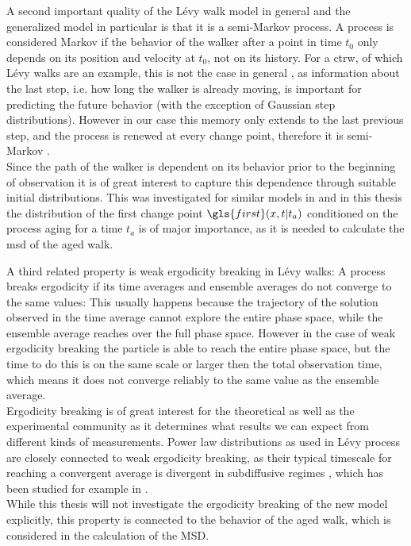 A second important quality of the L\'evy walk model in general and the generalized model in particular is that it is a semi-Markov process. A process is considered Markov if the behavior of the walker after a point in time $t_0$ only depends on its position and velocity at $t_0$, not on its history. For a \gls{ctrw}, of which L\'evy walks are an example, this is not the case in general 
\cite{firstSteps}, 
as information about the last step, i.e. how long the walker is already moving, is important for predicting the future behavior (with the exception of Gaussian step distributions). However in our case this memory only extends to the last previous step, and the process is renewed at every change point, therefore it is semi-Markov 
\cite{lwreview}.\\
Since the path of the walker is dependent on its behavior prior to the beginning of observation it is of great interest to capture this dependence through suitable initial distributions. This was investigated for similar models in 
\cite{barkai2003a, barkai2003b} 
and in this thesis the distribution of the first change point $\gls{first}(x,t|t_a)$ conditioned on the process aging for a time $t_a$ is of major importance, as it is needed to calculate the \gls{msd} of the aged walk.

A third related property is weak ergodicity breaking in L\'evy walks: A process breaks ergodicity if its time averages and ensemble averages do not converge to the same values: This usually happens because the trajectory of the solution observed in the time average cannot explore the entire phase space, while the ensemble average reaches over the full phase space. 
{\color{blue}
However in the case of weak ergodicity breaking the particle is able to reach the entire phase space, but the time to do this is on the same scale or larger then the total observation time, which means it does not converge reliably to the same value as the ensemble average. 
}\\
Ergodicity breaking is of great interest for the theoretical as well as the experimental community as it determines what results we can expect from different kinds of measurements. Power law distributions as used in L\'evy process are closely connected to weak ergodicity breaking, as their typical timescale for reaching a convergent average is divergent in subdiffusive regimes 
\cite{anomalousTransport}, 
which has been studied for example in 
\cite{brokmann2003,radons2018}.\\
While this thesis will not investigate the ergodicity breaking of the new model explicitly, this property is connected to the behavior of the aged walk, which is considered in the calculation of the MSD. 

